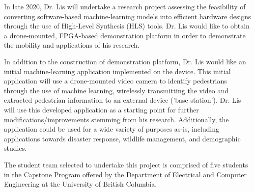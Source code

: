 In late 2020, Dr. Lis will undertake a research project assessing the feasibility of converting software-based machine-learning models into efficient hardware designs through the use of High-Level Synthesis (HLS) tools. Dr. Lis would like to obtain a drone-mounted, FPGA-based demonstration platform in order to demonstrate the mobility and applications of his research. 

In addition to the construction of demonstration platform, Dr. Lis would like an initial machine-learning application implemented on the device. This initial application will use a drone-mounted video camera to identify pedestrians through the use of machine learning, wirelessly transmitting the video and extracted pedestrian information to an external device ('base station'). Dr. Lis will use this developed application as a starting point for further modifications/improvements stemming from his research. Additionally, the application could be used for a wide variety of purposes as-is, including applications towards disaster response, wildlife management, and demographic studies.

The student team selected to undertake this project is comprised of five students in the Capstone Program offered by the Department of Electrical and Computer Engineering at the University of British Columbia.